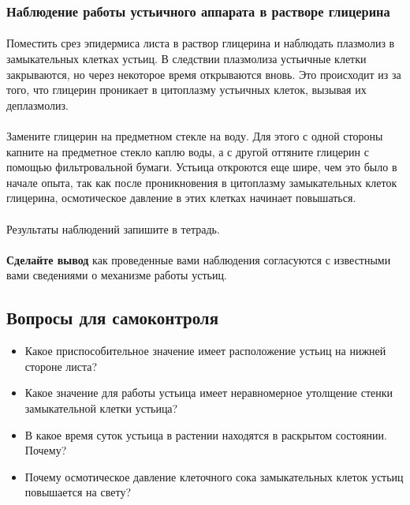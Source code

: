 \subsubsection*{Наблюдение работы устьичного аппарата в растворе глицерина}

\paragraph*{}Поместить срез эпидермиса листа в раствор глицерина и наблюдать плазмолиз в замыкательных клетках устьиц. В следствии плазмолиза устьичные клетки закрываются, но через некоторое время открываются вновь. Это происходит из за того, что глицерин проникает в цитоплазму устьичных клеток, вызывая их деплазмолиз.

\paragraph*{}Замените глицерин на предметном стекле на воду. Для этого с одной стороны капните на предметное стекло каплю воды, а с другой оттяните глицерин с помощью фильтровальной бумаги. Устьица откроются еще шире, чем это было в начале опыта, так как после проникновения в цитоплазму замыкательных клеток глицерина, осмотическое давление в этих клетках начинает повышаться.

\paragraph*{}Результаты наблюдений запишите в тетрадь.

\paragraph*{}\textbf{Сделайте вывод} как проведенные вами наблюдения согласуются с известными вами сведениями о механизме работы устьиц.

\subsection*{Вопросы для самоконтроля}

\begin{itemize}
	\item Какое приспособительное значение имеет расположение устьиц на нижней стороне листа?
	\item Какое значение для работы устьица имеет неравномерное утолщение стенки замыкательной клетки устьица?
	\item В какое время суток устьица в растении находятся в раскрытом состоянии. Почему?
	\item Почему осмотическое давление клеточного сока замыкательных клеток устьиц повышается на свету?
\end{itemize}

